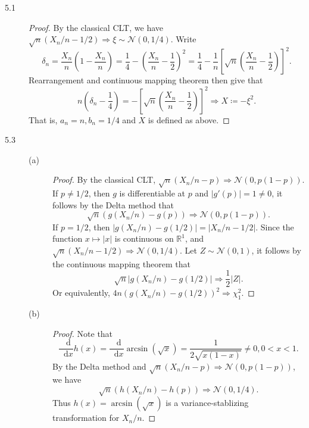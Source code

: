 \documentclass{article}
\newcommand{\real}{\mathbb{R}}
\newcommand{\dd}{\mathop{}\!\mathrm{d}}
\newcommand{\gaussian}{\mathcal{N}}
\theoremstyle{definition}
\theoremstyle{plain}
\theoremstyle{remark}
\begin{document}
\begin{description}
\item[5.1]
\begin{proof}
By the classical CLT, we have $\sqrt{n}(X_n/n - 1/2) \Rightarrow \xi \sim \gaussian(0, 1/4)$. Write
$$\delta_n = \frac{X_n}{n}\left(1 - \frac{X_n}{n}\right) = \frac{1}{4} - \left(\frac{X_n}{n} - \frac{1}{2}\right)^2 = \frac{1}{4} - \frac{1}{n}\left[\sqrt{n}\left(\frac{X_n}{n} - \frac{1}{2}\right)\right]^2.$$
Rearrangement and continuous mapping theorem then give that 
$$n\left(\delta_n - \frac{1}{4}\right) = - \left[\sqrt{n}\left(\frac{X_n}{n} - \frac{1}{2}\right)\right]^2 \Rightarrow X \coloneqq  -\xi^2.$$
That is, $a_n = n, b_n = 1/4$ and $X$ is defined as above. 
\end{proof}

\item[5.3]
\begin{description}
\item[(a)] 
\begin{proof}
By the classical CLT, $\sqrt{n}(X_n/n - p) \Rightarrow \gaussian(0, p(1 - p))$. If $p \neq 1/2$, then $g$ is differentiable at $p$ and $|g'(p)| = 1 \neq 0$, it follows by the Delta method that
$$\sqrt{n}(g(X_n/n) - g(p)) \Rightarrow \gaussian(0, p(1 - p)).$$
If $p = 1/2$, then $|g(X_n/n) - g(1/2)| = |X_n/n - 1/2|$. Since the function $x \mapsto |x|$ is continuous on $\real^1$, and $\sqrt{n}(X_n/n - 1/2) \Rightarrow \gaussian(0, 1/4)$. Let $Z \sim \gaussian(0, 1)$, it follows
by the continuous mapping theorem that 
$$\sqrt{n}|g(X_n/n) - g(1/2)| \Rightarrow \dfrac{1}{2}|Z|.$$
Or equivalently, $4n(g(X_n/n) - g(1/2))^2 \Rightarrow \chi_1^2$.
\end{proof}

\item[(b)]
\begin{proof}
Note that 
$$\frac{\dd}{\dd x} h(x) = \frac{\dd}{\dd x} \arcsin(\sqrt{x}) = \frac{1}{2\sqrt{x(1 - x)}} \neq 0, 0 < x < 1.$$
By the Delta method and $\sqrt{n}(X_n/n - p) \Rightarrow \gaussian(0, p(1 - p))$, we have
$$\sqrt{n}(h(X_n/n) - h(p)) \Rightarrow \gaussian(0, 1/4).$$
Thus $h(x) = \arcsin(\sqrt{x})$ is a variance-stablizing transformation for $X_n/n$. 
\end{proof}
\end{description}


\end{description}
\end{document}
